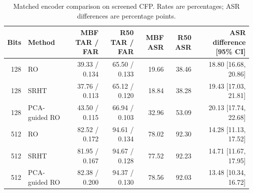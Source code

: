 \begin{table}[t]
\caption{Matched encoder comparison on screened CFP. Rates are percentages; ASR differences are percentage points.}
\label{tab:encoder-cfp}\centering\footnotesize
\begin{tabular}{@{}rlrrrrr@{}}\toprule
Bits & Method & MBF TAR / FAR & R50 TAR / FAR & MBF ASR & R50 ASR & ASR difference [95\% CI]\\\midrule
128 & RO & 39.33 / 0.134 & 65.50 / 0.133 & 19.66 & 38.46 & 18.80 [16.68, 20.86]\\
128 & SRHT & 37.76 / 0.113 & 65.12 / 0.120 & 18.84 & 38.28 & 19.43 [17.03, 21.81]\\
128 & PCA-guided RO & 43.50 / 0.115 & 66.94 / 0.103 & 32.96 & 53.09 & 20.13 [17.74, 22.68]\\
512 & RO & 82.52 / 0.172 & 94.61 / 0.134 & 78.02 & 92.30 & 14.28 [11.13, 17.52]\\
512 & SRHT & 81.95 / 0.167 & 94.67 / 0.128 & 77.52 & 92.23 & 14.71 [11.67, 17.95]\\
512 & PCA-guided RO & 82.38 / 0.200 & 94.37 / 0.130 & 78.56 & 92.03 & 13.48 [10.34, 16.72]\\
\bottomrule\end{tabular}
\end{table}

